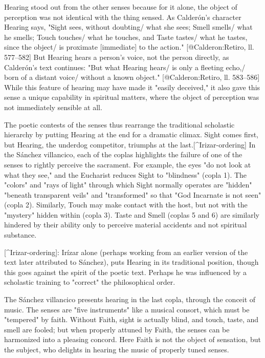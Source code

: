 Hearing stood out from the other senses because for it alone, the object of
perception was not identical with the thing sensed. 
As Calderón's character Hearing says, "Sight sees, without doubting/ what she
sees; Smell smells/ what he smells; Touch touches/ what he touches, and Taste
tastes/ what he tastes, since the object/ is proximate [immediate] to the
action."
[@Calderon:Retiro, ll. 577--582]
But Hearing hears a person's voice, not the person directly, as Calderón's text
continues: "But what Hearing hears/ is only a fleeting echo,/ born of a distant
voice/ without a known object."
[@Calderon:Retiro, ll. 583--586]
While this feature of hearing may have made it "easily deceived," it also gave
this sense a unique capability in spiritual matters, where the object of
perception was not immediately sensible at all. 

The poetic contests of the senses thus rearrange the traditional scholastic
hierarchy by putting Hearing at the end for a dramatic climax. 
Sight comes first, but Hearing, the underdog competitor, triumphs at the
last.[^Irizar-ordering] 
In the Sánchez villancico, each of the coplas highlights the failure of one of
the senses to rightly perceive the sacrament. 
For example, the eyes "do not look at what they see," and the Eucharist reduces
Sight to "blindness" (copla 1). 
The "colors" and "rays of light" through which Sight normally operates are
"hidden" "beneath transparent veils" and "transformed" so that "God Incarnate is
not seen" (copla 2). 
Similarly, Touch may make contact with the host, but not with the "mystery"
hidden within (copla 3). 
Taste and Smell (coplas 5 and 6) are similarly hindered by their ability only to
perceive material accidents and not spiritual substance. 

[^Irizar-ordering]: 
Irízar alone (perhaps working from an earlier version of the text later
attributed to Sánchez), puts Hearing in its traditional position, though this
goes against the spirit of the poetic text.
Perhaps he was influenced by a scholastic training to "correct" the
philosophical order. 

The Sánchez villancico presents hearing in the last copla, through the conceit
of music. 
The senses are "five instruments" like a musical consort, which must be
"tempered" by faith. 
Without Faith, sight is actually blind, and touch, taste, and smell
are fooled; but when properly attuned by Faith, the senses can be harmonized
into a pleasing concord. 
Here Faith is not the object of sensation, but the subject, who delights in
hearing the music of properly tuned senses. 

